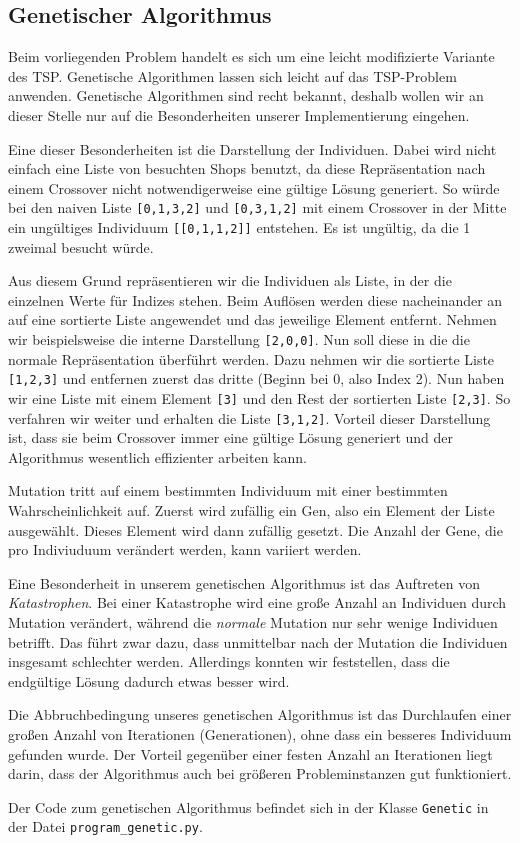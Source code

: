 \subsection{Genetischer Algorithmus}

Beim vorliegenden Problem handelt es sich um eine leicht modifizierte Variante des TSP. Genetische Algorithmen lassen sich leicht auf das TSP-Problem anwenden. Genetische Algorithmen sind recht bekannt, deshalb wollen wir an dieser Stelle nur auf die Besonderheiten unserer Implementierung eingehen.

Eine dieser Besonderheiten ist die Darstellung der Individuen. Dabei wird nicht einfach eine Liste von besuchten Shops benutzt, da diese Repräsentation nach einem Crossover nicht notwendigerweise eine gültige Lösung generiert. So würde bei den naiven Liste \texttt{[0,1,3,2]} und \texttt{[0,3,1,2]} mit einem Crossover in der Mitte ein ungültiges Individuum \texttt{[[0,1,1,2]]} entstehen. Es ist ungültig, da die 1 zweimal besucht würde. 

Aus diesem Grund repräsentieren wir die Individuen als Liste, in der die einzelnen Werte für Indizes stehen. Beim Auflösen werden diese nacheinander an auf eine sortierte Liste angewendet und das jeweilige Element entfernt. Nehmen wir beispielsweise die interne Darstellung \texttt{[2,0,0]}. Nun soll diese in die die normale Repräsentation überführt werden. Dazu nehmen wir die sortierte Liste \texttt{[1,2,3]} und entfernen zuerst das dritte (Beginn bei 0, also Index 2). Nun haben wir eine Liste mit einem Element \texttt{[3]} und den Rest der sortierten Liste \texttt{[2,3]}. So verfahren wir weiter und erhalten die Liste \texttt{[3,1,2]}. Vorteil dieser Darstellung ist, dass sie beim Crossover immer eine gültige Lösung generiert und der Algorithmus wesentlich effizienter arbeiten kann.

Mutation tritt auf einem bestimmten Individuum mit einer bestimmten Wahrscheinlichkeit auf. Zuerst wird zufällig ein Gen, also ein Element der Liste ausgewählt. Dieses Element wird dann zufällig gesetzt. Die Anzahl der Gene, die pro Indiviuduum verändert werden, kann variiert werden. 

Eine Besonderheit in unserem genetischen Algorithmus ist das Auftreten von \emph{Katastrophen}. Bei einer Katastrophe wird eine große Anzahl an Individuen durch Mutation verändert, während die \emph{normale} Mutation nur sehr wenige Individuen betrifft. Das führt zwar dazu, dass unmittelbar nach der Mutation die Individuen insgesamt schlechter werden. Allerdings konnten wir feststellen, dass die endgültige Lösung dadurch etwas besser wird. 

Die Abbruchbedingung unseres genetischen Algorithmus ist das Durchlaufen einer großen Anzahl von Iterationen (Generationen), ohne dass ein besseres Individuum gefunden wurde. Der Vorteil gegenüber einer festen Anzahl an Iterationen liegt darin, dass der Algorithmus auch bei größeren Probleminstanzen gut funktioniert.

Der Code zum genetischen Algorithmus befindet sich in der Klasse \texttt{Genetic} in der Datei \texttt{program\_genetic.py}.

